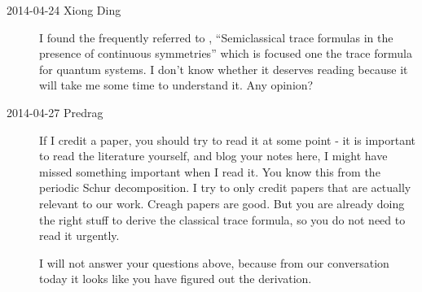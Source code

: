 \begin{description}

\item[2014-04-24 Xiong Ding]
I found the frequently referred to , ``Semiclassical
trace formulas in the presence of continuous symmetries'' which is
focused one the trace formula for quantum systems. I don't know whether
it deserves reading because it will take me some time to understand it.
Any opinion?

\item[2014-04-27 Predrag] If I credit a paper, you should try to read it
at some point - it is important to read the literature yourself, and blog
your notes here, I might have missed something important when I read it.
You know this from the periodic Schur decomposition. I try to only credit
papers that are actually relevant to our work. Creagh papers are good.
But you are already doing the right stuff to derive the classical trace
formula, so you do not need to read it urgently.

I will not answer your questions above, because from our conversation
today it looks like you have figured out the derivation.


\end{description}
